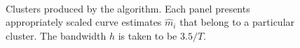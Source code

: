 \documentclass[a4paper,12pt]{article}
\numberwithin{equation}{section}
\begin{document}
\begin{figure}
\\
\hspace{0.25cm}
\caption{Clusters produced by the algorithm. Each panel presents appropriately scaled curve estimates $\hat{m}_i$ that belong to a particular cluster. The bandwidth $h$ is taken to be $3.5/T$.}\label{fig:clusters}
\end{figure}

\clearpage

{\small
\setlength{\bibsep}{0.35em}
}
\end{document}
